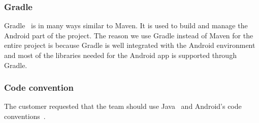 \subsubsection{Gradle}
Gradle~\cite{Gradle} is in many ways similar to Maven. It is used to build and manage the Android part of the project. The reason we use Gradle instead of Maven for the entire project is because Gradle is well integrated with the Android environment and most of the libraries needed for the Android app is supported through Gradle.

\subsubsection{Code convention}
The customer requested that the team should use Java~\cite{javaconv} and Android's code conventions~\cite{Androidconv}.
